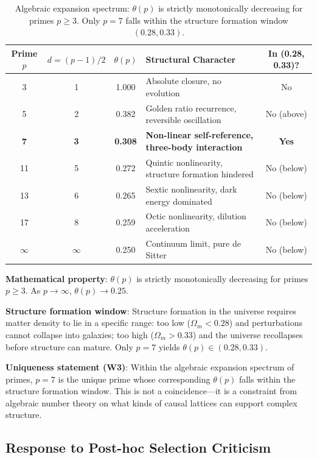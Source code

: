 \documentclass[aps,prd,twocolumn,nofootinbib,floatfix]{revtex4-2}
\begin{document}
\begin{table}[h]
\centering
\begin{tabular}{ccclc}
\hline
Prime $p$ & $d=(p-1)/2$ & $\theta(p)$ & Structural Character & In (0.28, 0.33)? \\
\hline
3 & 1 & 1.000 & Absolute closure, no evolution & No \\
5 & 2 & 0.382 & Golden ratio recurrence, reversible oscillation & No (above) \\
\textbf{7} & \textbf{3} & \textbf{0.308} & \textbf{Non-linear self-reference, three-body interaction} & \textbf{Yes} \\
11 & 5 & 0.272 & Quintic nonlinearity, structure formation hindered & No (below) \\
13 & 6 & 0.265 & Sextic nonlinearity, dark energy dominated & No (below) \\
17 & 8 & 0.259 & Octic nonlinearity, dilution acceleration & No (below) \\
$\infty$ & $\infty$ & 0.250 & Continuum limit, pure de Sitter & No (below) \\
\hline
\end{tabular}
\caption{Algebraic expansion spectrum: $\theta(p)$ is strictly monotonically decreasing for primes $p \ge 3$. Only $p=7$ falls within the structure formation window $(0.28, 0.33)$.}
\label{tab:expansion_spectrum}
\end{table}

\textbf{Mathematical property}: $\theta(p)$ is strictly monotonically decreasing for primes $p \ge 3$. As $p \to \infty$, $\theta(p) \to 0.25$.

\textbf{Structure formation window}: Structure formation in the universe requires matter density to lie in a specific range: too low ($\Omega_m < 0.28$) and perturbations cannot collapse into galaxies; too high ($\Omega_m > 0.33$) and the universe recollapses before structure can mature. Only $p=7$ yields $\theta(p) \in (0.28, 0.33)$.

\textbf{Uniqueness statement (W3)}: Within the algebraic expansion spectrum of primes, $p=7$ is the unique prime whose corresponding $\theta(p)$ falls within the structure formation window. This is not a coincidence---it is a constraint from algebraic number theory on what kinds of causal lattices can support complex structure.

\subsection{Response to Post-hoc Selection Criticism}
\end{document}
